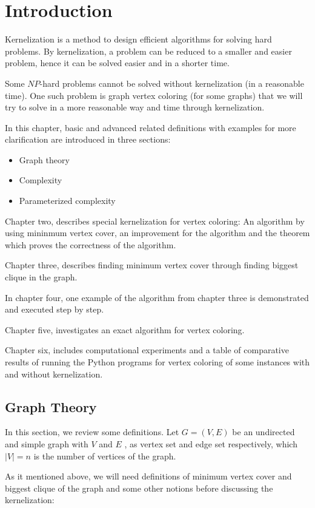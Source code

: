 \documentclass[12pt]{article}
\theoremstyle{slplain}
\begin{document}
\afterpage{\null\newpage}
\newpage
\setcounter{secnumdepth}{2}
\section{Introduction}
Kernelization is a method to design efficient algorithms for solving hard problems. By kernelization, a problem can be reduced to a smaller and easier problem, hence it can be solved easier and in a shorter time. 

Some $NP$-hard problems cannot be solved  without kernelization (in a reasonable time). One such problem is graph vertex coloring (for some graphs) that we will try to  solve in a more reasonable way and time through kernelization.

In this chapter, basic and advanced related definitions with examples for more clarification are introduced in three sections:
\begin{itemize}
\item Graph theory
\item Complexity
\item Parameterized complexity
\end{itemize}

Chapter two, describes special kernelization for vertex coloring: An algorithm by using mininmum vertex cover, an improvement for the algorithm and the theorem which proves the correctness of the algorithm.

Chapter three, describes finding minimum vertex cover through finding biggest clique in the graph.

In chapter four, one example of the algorithm from chapter three is demonstrated and executed step by step.

Chapter five, investigates an exact algorithm for vertex coloring.

Chapter six, includes computational experiments and a table of comparative results of running the Python programs for vertex coloring of some instances with and without kernelization.

\newpage
\subsection{Graph Theory}

In this section, we review some definitions. Let $G = (V, E)$ be an
undirected and simple graph with $V$ and $E$ , as vertex set and edge set
respectively, which $|V| = n$ is the number of vertices of the graph.

As it mentioned above, we will need definitions of minimum vertex cover and biggest clique of the graph and some other notions before discussing the kernelization:
\end{document}
